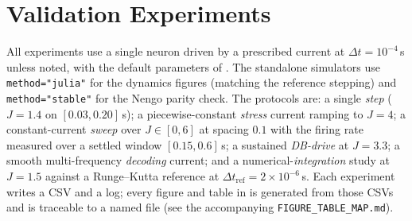 \documentclass[11pt]{article}
\newcommand{\code}[1]{\texttt{#1}}
\begin{document}
\section{Validation Experiments}\label{sec:experiments}
All experiments use a single neuron driven by a prescribed current at
$\Delta t=10^{-4}\,$s unless noted, with the default parameters of
. The standalone simulators use \code{method="julia"} for the
dynamics figures (matching the reference stepping) and \code{method="stable"}
for the Nengo parity check. The protocols are: a single \emph{step}
($J=1.4$ on $[0.03,0.20]\,$s); a piecewise-constant \emph{stress} current
ramping to $J=4$; a constant-current \emph{sweep} over $J\in[0,6]$ at spacing
$0.1$ with the firing rate measured over a settled window $[0.15,0.6]\,$s; a
sustained \emph{DB-drive} at $J=3.3$; a smooth multi-frequency
\emph{decoding} current; and a numerical-\emph{integration} study at
$J=1.5$ against a Runge--Kutta reference at $\Delta t_{\mathrm{ref}}=2\times
10^{-6}\,$s. Each experiment writes a CSV and a log; every figure and table in
 is generated from those CSVs and is traceable to a named
file (see the accompanying \code{FIGURE\_TABLE\_MAP.md}).
\end{document}

